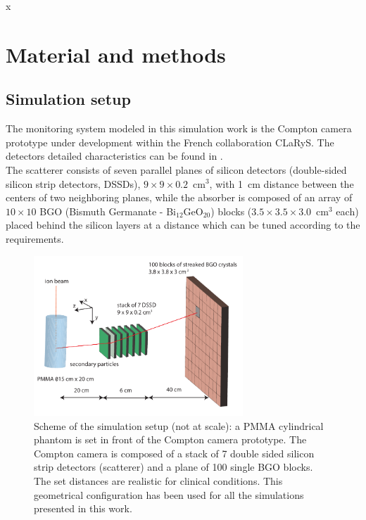 x
\section{Material and methods}

\subsection{Simulation setup}\label{SimuSetup}

The monitoring system modeled in this simulation work is the Compton camera prototype under development within the French collaboration CLaRyS. The detectors detailed characteristics can be found in \cite{krimmer:hal-01101334}.\\
The scatterer consists of seven parallel planes of silicon detectors (double-sided silicon strip detectors, DSSDs), $9\times9\times0.2$~cm$^3$, with 1~cm distance between the centers of two neighboring planes, while the absorber is composed of an array of $10\times10$ BGO (Bismuth Germanate - Bi$_{12}$GeO$_{20}$) blocks ($3.5\times3.5\times3.0$~cm$^3$ each) placed behind the silicon layers at a distance which can be tuned according to the requirements.

\begin{figure}	
  \centering
  \includegraphics[width=0.7\textwidth]{./Figure/Compton_Camera_hadontherapy_PMMA_Cylinder_EN.pdf}
  \caption{Scheme of the simulation setup (not at scale): a PMMA cylindrical phantom is set in front of the Compton camera prototype. The Compton camera is composed of a stack of 7 double sided silicon strip detectors (scatterer) and a plane of 100 single BGO blocks. The set distances are realistic for clinical conditions. This geometrical configuration has been used for all the simulations presented in this work.}
  \label{fig:fig_setup_CC_simulation_Hadronth}
\end{figure}

